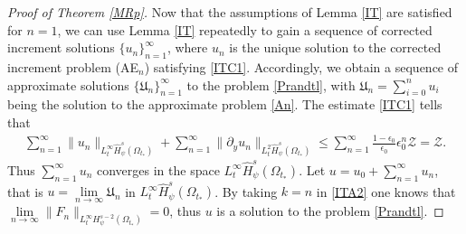 \documentclass{amsart}
\numberwithin{equation}{section}
\begin{document}
\begin{proof}[Proof of Theorem \ref{MRp}]
Now that the assumptions of Lemma \ref{IT} are satisfied for $n=1$, we can use Lemma \ref{IT} repeatedly to gain a sequence of corrected increment solutions $\{u_{n}\}_{n=1}^{\infty}$, where $u_{n}$ is the unique solution to the corrected increment problem (AE$_{n}$) satisfying \eqref{ITC1}. Accordingly, we obtain a sequence of approximate solutions $\{\mathfrak{U}_{n}\}_{n=1}^{\infty}$ to the problem \eqref{Prandtl}, with $\mathfrak{U}_{n}=\sum\limits_{i=0}^{n}u_{i}$ being the solution to the approximate problem \eqref{An}.
The estimate \eqref{ITC1} tells that
\begin{align}\label{ITC-1}
\sum_{n=1}^{\infty}\|u_{n}\|_{L_{t}^{\infty}\hat{H}_{\psi}^{s}(\Omega_{t_{*}})}
+\sum_{n=1}^{\infty}\|\partial_{y}u_{n}\|_{L_{t}^{2}\hat{H}_{\psi}^{s}(\Omega_{t_{*}})}
\leq\sum_{n=1}^{\infty}\frac{1-\epsilon_{0}}{\epsilon_{0}}\epsilon_{0}^{n}\mathcal{Z}=\mathcal{Z}.
\end{align}
Thus $\sum\limits_{n=1}^{\infty}u_{n}$ converges in the space $L_{t}^{\infty}\hat{H}_{\psi}^{s}(\Omega_{t_{*}})$. Let $u=u_{0}+\sum\limits_{n=1}^{\infty}u_{n}$,
that is $u=\lim\limits_{n\to\infty}\mathfrak{U}_{n}$ in $L_{t}^{\infty}\hat{H}_{\psi}^{s}(\Omega_{t_{*}})$. By taking $k=n$ in \eqref{ITA2} one knows that $\lim\limits_{n\to\infty}\|F_{n}\|_{L_{t}^{\infty}H_{\psi}^{s-2}(\Omega_{t_{*}})}=0$, thus $u$ is a solution to the problem \eqref{Prandtl}.


\end{proof}
\end{document}
